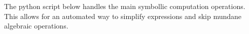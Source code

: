 The python script below handles the main symbollic computation operations. This allows for an automated way to simplify expressions and skip mundane algebraic operations.
